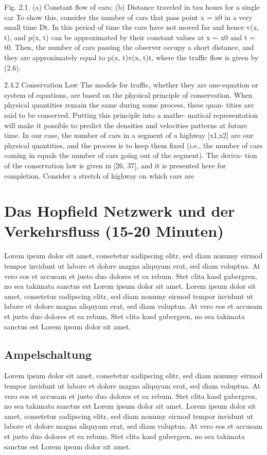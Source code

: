 \documentclass[journal=jacsat,manuscript=article]{achemso}
\begin{document}
Fig. 2.1. (a) Constant flow of cars; (b) Distance traveled in tau hours for a single car
To show this, consider the number of cars that pass point x = x0 in a very small time Dt. In this period of time the cars have not moved far and hence v(x, t), and p(x, t) can be approximated by their constant values at x = x0 and t = t0. Then, the number of cars passing the observer occupy a short distance, and they are approximately equal to p(x, t)v(x, t)t, where the traffic flow is given by (2.6).

2.4.2 Conservation Law
The models for traffic, whether they are one-equation or system of equations, are based on the physical principle of conservation. When physical quantities remain the same during some process, these quan- tities are said to be conserved. Putting this principle into a mathe- matical representation will make it possible to predict the densities and velocities patterns at future time. In our case, the number of cars in a segment of a highway [x1,x2] are our physical quantities, and the process is to keep them fixed (i.e., the number of cars coming in equals the number of cars going out of the segment). The deriva- tion of the conservation law is given in [26, 37], and it is presented here for completion. Consider a stretch of highway on which cars are

\newpage

\section*{Das Hopfield Netzwerk und der Verkehrsfluss (15-20 Minuten)}
Lorem ipsum dolor sit amet, consetetur sadipscing elitr, sed diam nonumy eirmod tempor invidunt ut labore et dolore magna aliquyam erat, sed diam voluptua. At vero eos et accusam et justo duo dolores et ea rebum. Stet clita kasd gubergren, no sea takimata sanctus est Lorem ipsum dolor sit amet. Lorem ipsum dolor sit amet, consetetur sadipscing elitr, sed diam nonumy eirmod tempor invidunt ut labore et dolore magna aliquyam erat, sed diam voluptua. At vero eos et accusam et justo duo dolores et ea rebum. Stet clita kasd gubergren, no sea takimata sanctus est Lorem ipsum dolor sit amet.

\subsection*{Ampelschaltung}
Lorem ipsum dolor sit amet, consetetur sadipscing elitr, sed diam nonumy eirmod tempor invidunt ut labore et dolore magna aliquyam erat, sed diam voluptua. At vero eos et accusam et justo duo dolores et ea rebum. Stet clita kasd gubergren, no sea takimata sanctus est Lorem ipsum dolor sit amet. Lorem ipsum dolor sit amet, consetetur sadipscing elitr, sed diam nonumy eirmod tempor invidunt ut labore et dolore magna aliquyam erat, sed diam voluptua. At vero eos et accusam et justo duo dolores et ea rebum. Stet clita kasd gubergren, no sea takimata sanctus est Lorem ipsum dolor sit amet.
\end{document}
